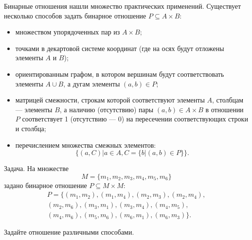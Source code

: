 Бинарные отношения нашли множество практических применений. Существует несколько способов задать бинарное отношение $P\subseteq A\times B$:
\begin{itemize}
    \item множеством упорядоченных пар из $A\times B$;
    \item точками в декартовой системе координат (где на осях будут отложены элементы $A$ и $B$);
    \item ориентированным графом, в котором вершинам будут соответствовать элементы $A\cup B$, а дугам элементы $(a,b)\in P$;
    \item матрицей смежности, строкам которой соответствуют элементы $A$, столбцам --- элементы $B$, а наличию (отсутствию) пары $(a,b)\in A\times B$ в отношении $P$ соответствует 1 (отсутствию --- 0) на пересечении соответствующих строки и столбца;
    \item перечислением множества смежных элементов: \[\{(a,C)|a\in A,C=\{b|(a,b)\in P\}\}.\]
\end{itemize}

\begin{exampl} Задача.
    На множестве 
        \[M=\{m_1,m_2,m_3,m_4,m_5,m_6\}\] 
    задано бинарное отношение $P\subseteq M\times M$:
    \begin{equation}
        \label{eq:binary}
        \begin{split}
            P=\{
                (m_1,m_2),
                (m_1,m_4),
                (m_2,m_3),
                (m_2,m_4),\\
                (m_2,m_6),
                (m_3,m_1),
                (m_3,m_4),
                (m_4,m_5),\\
                (m_4,m_6),
                (m_5,m_6),
                (m_6,m_1),
                (m_6,m_3)
            \}.
        \end{split}
    \end{equation}
    
    Задайте отношение различными способами.
\end{exampl}

